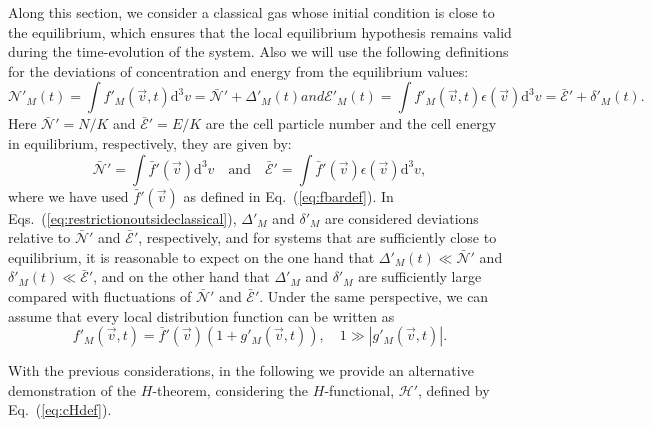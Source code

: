 Along this section, we consider a classical gas
whose initial condition is close to the equilibrium,
which ensures that the local equilibrium hypothesis remains valid during
the time-evolution of the system.
Also we will use the following definitions for the deviations of concentration 
and energy from the equilibrium values:
\begin{subequations}\label{eq:restrictionoutsideclassical}
%
\begin{equation}
      \mathcal{N}'_M(t)=\int f'_{M}(\vec{v},t) \mathrm{d}^{3}v=
      \bar{\mathcal{N}}'+\Delta'_M(t)
\end{equation}
%
and
%
\begin{equation}
      \mathcal{E}'_M(t)=\int f'_{M}(\vec{v},t) \epsilon(\vec{v}) \mathrm{d}^{3}v=
      \bar{\mathcal{E}}'+ \delta'_M(t).
\end{equation}
\end{subequations}
%
Here $\bar {\mathcal{N}}' =N/K$ and $\bar{\mathcal{E}}'=E/K$ are
the cell particle number and the cell energy in equilibrium, respectively, they are given by:
%
    \begin{equation}
      \bar{\mathcal{N}}'=
      \int \bar{f}'(\vec{v}) \mathrm{d}^{3}v\quad\textrm{and} \quad
      \bar{\mathcal{E}}'=
      \int \bar{f}'(\vec{v})\epsilon(\vec{v}) \mathrm{d}^{3}v,
    \end{equation}
where we have used $\bar{f}'(\vec{v})$ as defined in Eq.~(\ref{eq:fbardef}).
In Eqs.~(\ref{eq:restrictionoutsideclassical}), $\Delta'_M$ and $\delta'_M$
are considered deviations relative to
$\bar{\mathcal{N}}'$ and $\bar{\mathcal{E}}'$, respectively, and for systems that are
sufficiently close to equilibrium, it is reasonable to expect on the one hand that
$\Delta'_M(t)\ll\bar{\mathcal{N}}'$ and
$\delta'_M(t)\ll\bar{\mathcal{E}}'$, and on the other hand that $\Delta'_M$ and
$\delta'_M$ are sufficiently large compared with fluctuations of $\bar{\mathcal{N}}'$
and $\bar{\mathcal{E}}'$. Under the same perspective, we can assume that every local
distribution function can be written as
\begin{equation}\label{eq:firstorder}
   f'_{M}(\vec{v},t)=\bar{f}'(\vec{v})(1+g'_{M}(\vec{v},t)),\quad
   1\gg|g'_{M}(\vec{v},t)|.
\end{equation}
%

With the previous considerations, in the following we provide an alternative demonstration
of the $H$-theorem, considering the $H$-functional, $\mathcal{H}'$, defined by Eq.~(\ref{eq:cHdef}).

